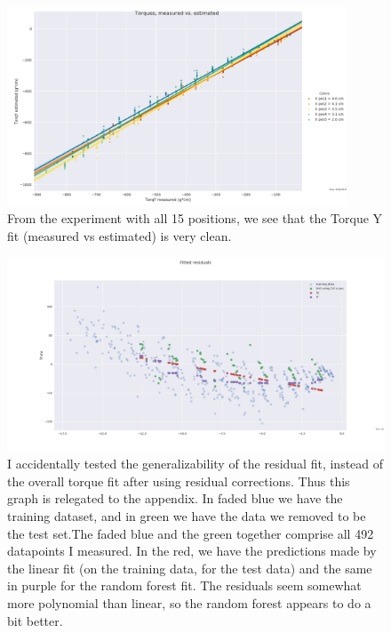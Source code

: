 \documentclass[preprint,12pt,3p]{elsarticle}
\begin{document}
\begin{figure}[tb!]
\centering
            \includegraphics[width=0.9\textwidth]{images/round1/TorqY_Colors_X.png}%
            \caption{From the experiment with all 15 positions, we see that the Torque Y fit
            (measured vs estimated) is very clean.}
            \label{fig:yX}
\end{figure}


\begin{figure}[tb!]
\centering
\includegraphics[width=1\textwidth]{images/round1/generalize_residfit.png}
\caption{I accidentally tested the generalizability of the residual fit, instead of the overall
torque fit after using residual corrections. Thus this graph is relegated to the appendix. In faded
blue we have the training dataset, and in green we have the data we removed to be the test set.The
faded blue and the green together comprise all 492 datapoints I measured. In the red, we have the
predictions made by the linear fit (on the training data, for the test data) and the same in purple
for the random forest fit. The residuals seem somewhat more polynomial than linear, so the random
forest appears to do a bit better. }
    \label{fig:general}
\end{figure}
\end{document}

